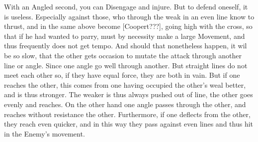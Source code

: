 With an Angled second, you can Disengage and injure. But to defend
oneself, it is useless. Especially against those, who through the weak
in an even line know to thrust, and in the same above become
[Coopert???],
going high with the cross, so that if he had wanted to parry, must by
necessity make a large Movement, and thus frequently does not get tempo.
And should that nonetheless happen, it wil be so slow, that the other
gets occasion to mutate the attack through another line or
angle. Since one angle go well through another. But straight lines do
not meet each other so, if they have equal force, they are both in
vain. But if one reaches the other, this  comes from one having
occupied the other's weal better, and is thus stronger.
The weaker is thus always pushed out of line, the other goes evenly
and reaches. On the other hand one angle passes through the other, and
reaches without resistance the other. Furthermore, if one deflects
from the other, they reach even quicker, and in this way they pass
against even lines and thus hit in the Enemy's movement.